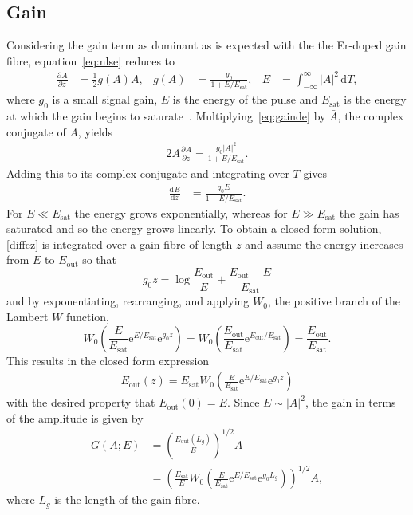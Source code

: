 \documentclass[12pt]{article}
\providecommand{\df}{\textrm{d}}
\newcommand{\diff}[3][]{\frac{\textrm{d}^{#1}#2}{\textrm{d}{#3}^{#1}}}
\newcommand{\pdiff}[3][]{\frac{\partial^{#1}#2}{\partial{#3}^{#1}}}
\newcommand{\Es}{E_{\textrm{sat}}}
\begin{document}
\subsection{Gain}
Considering the gain term as dominant as is expected with the the Er-doped gain fibre, equation~\eqref{eq:nlse} reduces to
\begin{align}
\label{eq:gainde}
	\pdiff{A}{z} &= \frac{1}{2} g(A) A,& g(A) &= \frac{g_0}{1 + E / \Es},& E &= \int_{-\infty}^\infty |A|^2 \, \df T,
\end{align}
where $g_0$ is a small signal gain, $E$ is the energy of the pulse and $\Es$ is the energy at which the gain begins to saturate~\cite{bohun, burgoyne2014, shtyrina, silfvast, yarutkina}.
Multiplying~\eqref{eq:gainde} by $\bar{A}$, the complex conjugate of $A$, yields
\begin{align*}
	2\bar{A} \pdiff{A}{z} = \frac{g_0 |A|^2}{1 + E / \Es}.
\end{align*}
Adding this to its complex conjugate and integrating over $T$ gives
\begin{align}
\label{diffez}
	\diff{E}{z} &= \frac{g_0 E}{1 + E / \Es}.
\end{align}
For $E \ll \Es$ the energy grows exponentially, whereas for $E \gg \Es$ the gain has saturated and so the energy grows linearly. To obtain a closed form solution, \eqref{diffez} is integrated over a gain fibre of length $z$ and assume the energy increases from $E$ to $E_{\textrm{out}}$ so that
\[
	g_0 z = \log\frac{E_{\textrm{out}}}{E} + \frac{E_{\textrm{out}}-E}{\Es}
\]
and by exponentiating, rearranging, and applying $W_0$, the positive branch of the Lambert $W$ function,
\[
	 W_0\left(\frac{E}{\Es} \textrm{e}^{E/\Es} \textrm{e}^{g_0 z}\right) = 
	 W_0\left(\frac{E_{\textrm{out}}}{\Es} \textrm{e}^{E_{\textrm{out}}/\Es}\right) = \frac{E_{\textrm{out}}}{\Es}.
\]
This results in the closed form expression
\begin{align}
\label{eq:energy}
	E_{\textrm{out}}(z) = \Es W_0 \left( \frac{E}{\Es} \textrm{e}^{E/\Es} \textrm{e}^{g_0 z} \right)
\end{align}
with the desired property that $E_{\textrm{out}}(0)=E$. Since $E \sim |A|^2$, the gain in terms of the amplitude is given by
\begin{align}
	\nonumber G(A;E) &= \left(\frac{E_{\textrm{out}}(L_g)}{E}\right)^{1/2}A \\
	\label{eq:gain}
	&= \left( \frac{\Es}{E} W_0 \left( \frac{E}{\Es} \textrm{e}^{E/\Es} 
	\textrm{e}^{g_0 L_g} \right) \right)^{1/2} A,
\end{align}
where $L_g$ is the length of the gain fibre.
\end{document}
